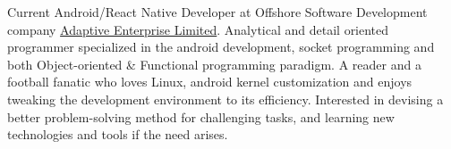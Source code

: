 

\begin{cvparagraph}

Current Android/React Native Developer at Offshore Software Development company {\href{http://ael-bd.com}{Adaptive Enterprise Limited}}. 
Analytical and detail oriented programmer specialized in the android development, socket programming and both Object-oriented \& Functional programming paradigm. 
A reader and a football fanatic who loves Linux, android kernel customization and enjoys tweaking the development environment to its efficiency. 
Interested in devising a better problem-solving method for challenging tasks, and learning new technologies and tools if the need arises.
\end{cvparagraph}
